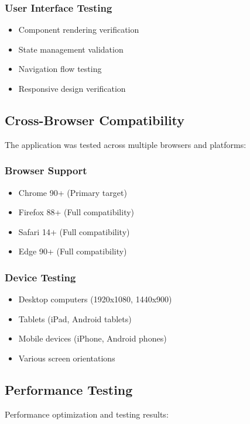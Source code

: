 \documentclass[12pt,a4paper]{article}
\begin{document}
\subsubsection{User Interface Testing}
\begin{itemize}
    \item Component rendering verification
    \item State management validation
    \item Navigation flow testing
    \item Responsive design verification
\end{itemize}

\subsection{Cross-Browser Compatibility}
The application was tested across multiple browsers and platforms:

\subsubsection{Browser Support}
\begin{itemize}
    \item Chrome 90+ (Primary target)
    \item Firefox 88+ (Full compatibility)
    \item Safari 14+ (Full compatibility)
    \item Edge 90+ (Full compatibility)
\end{itemize}

\subsubsection{Device Testing}
\begin{itemize}
    \item Desktop computers (1920x1080, 1440x900)
    \item Tablets (iPad, Android tablets)
    \item Mobile devices (iPhone, Android phones)
    \item Various screen orientations
\end{itemize}

\subsection{Performance Testing}
Performance optimization and testing results:
\end{document}
